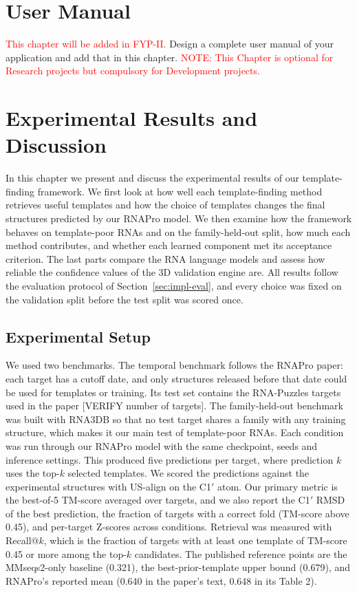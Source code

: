\documentclass{FastFyp}
\begin{document}
\clearpage


\chapter{User Manual}
\label{ch:manual}
\textcolor{red}{This chapter will be added in FYP-II.} Design a complete user manual of your application and add that in this chapter.
\textcolor{red}{NOTE: This Chapter is optional for Research projects but compulsory for Development projects.}\\
\clearpage
\chapter{Experimental Results and Discussion}
\label{ch:results}
In this chapter we present and discuss the experimental results of our template-finding framework. We first look at how well each template-finding method retrieves useful templates and how the choice of templates changes the final structures predicted by our RNAPro model. We then examine how the framework behaves on template-poor RNAs and on the family-held-out split, how much each method contributes, and whether each learned component met its acceptance criterion. The last parts compare the RNA language models and assess how reliable the confidence values of the 3D validation engine are. All results follow the evaluation protocol of Section~\ref{sec:impl-eval}, and every choice was fixed on the validation split before the test split was scored once.

\section{Experimental Setup}
We used two benchmarks. The temporal benchmark follows the RNAPro paper: each target has a cutoff date, and only structures released before that date could be used for templates or training. Its test set contains the RNA-Puzzles targets used in the paper [VERIFY number of targets]. The family-held-out benchmark was built with RNA3DB so that no test target shares a family with any training structure, which makes it our main test of template-poor RNAs. Each condition was run through our RNAPro model with the same checkpoint, seeds and inference settings. This produced five predictions per target, where prediction $k$ uses the top-$k$ selected templates. We scored the predictions against the experimental structures with US-align on the C1$'$ atom. Our primary metric is the best-of-5 TM-score averaged over targets, and we also report the C1$'$ RMSD of the best prediction, the fraction of targets with a correct fold (TM-score above 0.45), and per-target Z-scores across conditions. Retrieval was measured with Recall@$k$, which is the fraction of targets with at least one template of TM-score 0.45 or more among the top-$k$ candidates. The published reference points are the MMseqs2-only baseline (0.321), the best-prior-template upper bound (0.679), and RNAPro's reported mean (0.640 in the paper's text, 0.648 in its Table 2).
\end{document}
